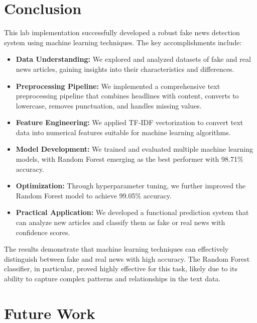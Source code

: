 \documentclass[12pt]{article}
\begin{document}
\section{Conclusion}

This lab implementation successfully developed a robust fake news detection system using machine learning techniques. The key accomplishments include:

\begin{itemize}
    \item \textbf{Data Understanding:} We explored and analyzed datasets of fake and real news articles, gaining insights into their characteristics and differences.
    
    \item \textbf{Preprocessing Pipeline:} We implemented a comprehensive text preprocessing pipeline that combines headlines with content, converts to lowercase, removes punctuation, and handles missing values.
    
    \item \textbf{Feature Engineering:} We applied TF-IDF vectorization to convert text data into numerical features suitable for machine learning algorithms.
    
    \item \textbf{Model Development:} We trained and evaluated multiple machine learning models, with Random Forest emerging as the best performer with 98.71\% accuracy.
    
    \item \textbf{Optimization:} Through hyperparameter tuning, we further improved the Random Forest model to achieve 99.05\% accuracy.
    
    \item \textbf{Practical Application:} We developed a functional prediction system that can analyze new articles and classify them as fake or real news with confidence scores.
\end{itemize}

The results demonstrate that machine learning techniques can effectively distinguish between fake and real news with high accuracy. The Random Forest classifier, in particular, proved highly effective for this task, likely due to its ability to capture complex patterns and relationships in the text data.

\section{Future Work}
\end{document}
